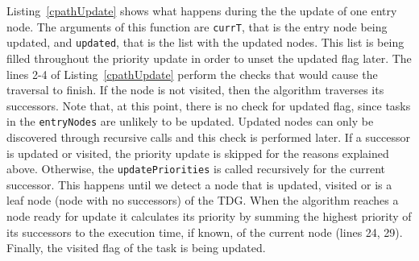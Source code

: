


Listing~\ref{cpathUpdate} shows what happens during the the update of one entry node.
The arguments of this function are \texttt{currT}, that is the entry node being updated, and \texttt{updated}, that is the list with the updated nodes. 
This list is being filled throughout the priority update in order to unset the updated flag later.
The lines 2-4 of Listing~\ref{cpathUpdate} perform the checks that would cause the traversal to finish.
If the node is not visited, then the algorithm traverses its successors.
Note that, at this point, there is no check for updated flag, since tasks in the \texttt{entryNodes} are unlikely to be updated. 
Updated nodes can only be discovered through recursive calls and this check is performed later.
If a successor is updated or visited, the priority update is skipped for the reasons explained above. 
Otherwise, the \texttt{updatePriorities} is called recursively for the current successor.
This happens until we detect a node that is updated, visited or is a leaf node (node with no successors) of the TDG.
When the algorithm reaches a node ready for update it calculates its priority by summing the highest priority of its successors to the execution time, if known, of the current node (lines 24, 29).
Finally, the visited flag of the task is being updated. 

